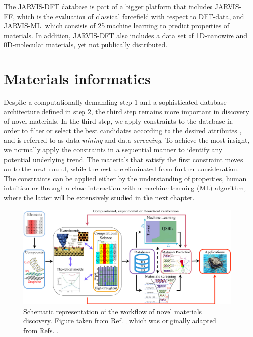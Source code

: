 The JARVIS-DFT database is part of a bigger platform that includes JARVIS-FF, which is the evaluation of classical forcefield with respect to DFT-data, and JARVIS-ML, which consists of 25 machine learning to predict properties of materials. In addition, JARVIS-DFT also includes a data set of 1D-nanowire and 0D-molecular materials, yet not publically distributed.

\section{Materials informatics}

Despite a computationally demanding step $1$ and a sophisticated database architecture defined in step $2$, the third step remains more important in discovery of novel materials. In the third step, we apply constraints to the database in order to filter or select the best candidates according to the desired attributes \cite{Schleder2019}, and is referred to as data \textit{mining} and data \textit{screening}. To achieve the most insight, we normally apply the constraints in a sequential manner to identify any potential underlying trend. The materials that satisfy the first constraint moves on to the next round, while the rest are eliminated from further consideration. The constraints can be applied either by the understanding of properties, human intuition or through a close interaction with a machine learning (ML) algorithm, where the latter will be extensively studied in the next chapter.

\begin{figure}[ht!]
  \centering
  \includegraphics{theory/figures/ht-workflow.jpg}
  \caption{Schematic representation of the workflow of novel materials discovery.  Figure taken from Ref. \cite{Schleder2019}, which was originally adapted from Refs. \cite{Mounet2018, Acosta2018, Polini2013}.}
  \label{fig:ht-workflow}
\end{figure}

